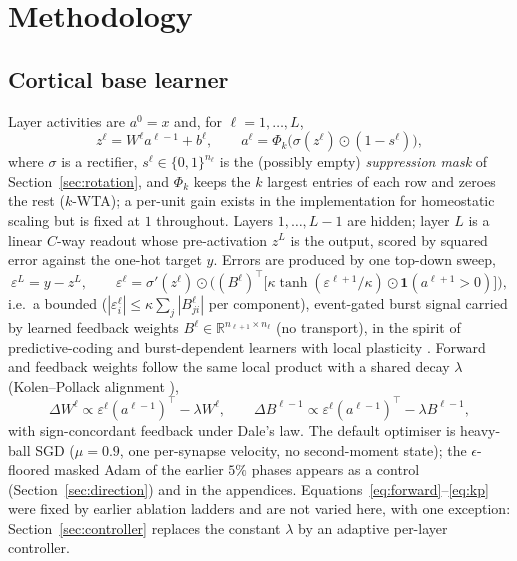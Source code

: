 \documentclass{article}
\newcommand{\kwta}{$k$-WTA}
\begin{document}
\section{Methodology}
\label{sec:method}

\subsection{Cortical base learner}

Layer activities are $a^0 = x$ and, for $\ell = 1,\dots,L$,
\begin{equation}
z^\ell = W^\ell a^{\ell-1} + b^\ell, \qquad
a^\ell = \Phi_k\!\big(\sigma(z^\ell)\odot(1-s^\ell)\big),
\label{eq:forward}
\end{equation}
where $\sigma$ is a rectifier, $s^\ell \in \{0,1\}^{n_\ell}$ is the (possibly empty)
\emph{suppression mask} of Section~\ref{sec:rotation}, and $\Phi_k$ keeps the $k$ largest entries
of each row and zeroes the rest (\kwta); a per-unit gain exists in the implementation for
homeostatic scaling but is fixed at $1$ throughout. Layers $1,\dots,L{-}1$ are hidden; layer $L$
is a linear $C$-way readout whose pre-activation $z^L$ is the output, scored by squared error
against the one-hot target $y$. Errors are produced by one top-down sweep,
\begin{equation}
\varepsilon^L = y - z^L, \qquad
\varepsilon^\ell = \sigma'(z^\ell)\odot\Big((B^\ell)^{\!\top} \big[\kappa\tanh(\varepsilon^{\ell+1}/\kappa)
\odot \mathbf{1}(a^{\ell+1}>0)\big]\Big),
\label{eq:sweep}
\end{equation}
i.e.\ a bounded ($|\varepsilon^\ell_i|\le\kappa\sum_j|B^\ell_{ji}|$ per component), event-gated
burst signal carried by learned feedback weights
$B^\ell\in\mathbb{R}^{n_{\ell+1}\times n_\ell}$ (no transport), in the spirit of
predictive-coding and burst-dependent learners with local plasticity
\citep{whittington2017,payeur2021}. Forward and feedback weights follow the same local product with a shared decay
$\lambda$ (Kolen--Pollack alignment \citep{kolen1994,akrout2019}),
\begin{equation}
\Delta W^\ell \propto \varepsilon^\ell (a^{\ell-1})^{\!\top} - \lambda W^\ell,\qquad
\Delta B^{\ell-1} \propto \varepsilon^\ell (a^{\ell-1})^{\!\top} - \lambda B^{\ell-1},
\label{eq:kp}
\end{equation}
with sign-concordant feedback under Dale's law. The default optimiser is heavy-ball SGD
($\mu=0.9$, one per-synapse velocity, no second-moment state); the $\epsilon$-floored masked
Adam of the earlier $5\%$ phases appears as a control (Section~\ref{sec:direction}) and in the
appendices. Equations~\eqref{eq:forward}--\eqref{eq:kp} were fixed by earlier
ablation ladders and are not varied here, with one exception: Section~\ref{sec:controller}
replaces the constant $\lambda$ by an adaptive per-layer controller.
\end{document}
